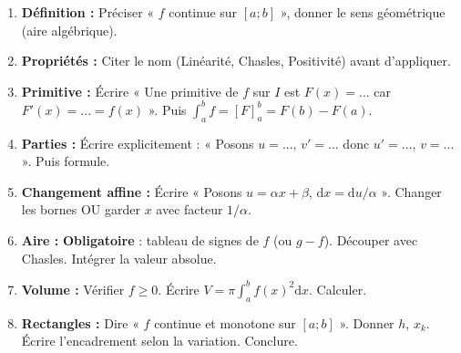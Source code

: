 \documentclass[11pt]{article}
\begin{document}
\begin{methode}
\begin{enumerate}
  \item \textbf{Définition :} Préciser « $f$ continue sur $[a;b]$ », donner le sens géométrique (aire algébrique).
  \item \textbf{Propriétés :} Citer le nom (Linéarité, Chasles, Positivité) avant d'appliquer.
  \item \textbf{Primitive :} Écrire « Une primitive de $f$ sur $I$ est $F(x)=...$ car $F'(x)=...=f(x)$ ». Puis $\int_a^b f = [F]_a^b = F(b)-F(a)$.
  \item \textbf{Parties :} Écrire explicitement : « Posons $u=...$, $v'=...$ donc $u'=...$, $v=...$ ». Puis formule.
  \item \textbf{Changement affine :} Écrire « Posons $u=\alpha x+\beta$, $\mathrm{d}x=\mathrm{d}u/\alpha$ ». Changer les bornes OU garder $x$ avec facteur $1/\alpha$.
  \item \textbf{Aire :} \textbf{Obligatoire} : tableau de signes de $f$ (ou $g-f$). Découper avec Chasles. Intégrer la valeur absolue.
  \item \textbf{Volume :} Vérifier $f\ge 0$. Écrire $V=\pi\int_a^b f(x)^2\mathrm{d}x$. Calculer.
  \item \textbf{Rectangles :} Dire « $f$ continue et monotone sur $[a;b]$ ». Donner $h$, $x_k$. Écrire l'encadrement selon la variation. Conclure.
\end{enumerate}
\end{methode}
\end{document}
